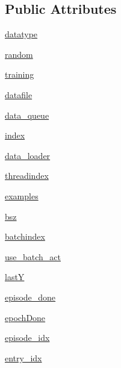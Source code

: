 \subsection*{Public Attributes}
\begin{DoxyCompactItemize}
\item 
\hyperlink{classparlai_1_1core_1_1teachers_1_1FixedDialogTeacher_a65c9039b783299ad6033ccbb995ca493}{datatype}
\item 
\hyperlink{classparlai_1_1core_1_1teachers_1_1FixedDialogTeacher_a7e5054e18ce919c0eb04188c801ddef1}{random}
\item 
\hyperlink{classparlai_1_1core_1_1teachers_1_1FixedDialogTeacher_af64b55521fe587c17696b0b805a2b0d4}{training}
\item 
\hyperlink{classparlai_1_1core_1_1teachers_1_1FixedDialogTeacher_a822d9f5c86ab0b0c608ae26901d3dec3}{datafile}
\item 
\hyperlink{classparlai_1_1core_1_1teachers_1_1FixedDialogTeacher_a59d9cf6a9e7f64a5d9a8d180ed06c001}{data\+\_\+queue}
\item 
\hyperlink{classparlai_1_1core_1_1teachers_1_1FixedDialogTeacher_a73ac86c06c926ab7aedd73d49e3bb2b5}{index}
\item 
\hyperlink{classparlai_1_1core_1_1teachers_1_1FixedDialogTeacher_a7edc6520195726382082a76486fa3747}{data\+\_\+loader}
\item 
\hyperlink{classparlai_1_1core_1_1teachers_1_1FixedDialogTeacher_a4443c43dc20f8f817c8cf28e2d795d6d}{threadindex}
\item 
\hyperlink{classparlai_1_1core_1_1teachers_1_1FixedDialogTeacher_a95eb8aeb051fc81a10ac7e1a7d5fed3d}{examples}
\item 
\hyperlink{classparlai_1_1core_1_1teachers_1_1FixedDialogTeacher_a2f6069ff207d360edf2729c245ceaa0f}{bsz}
\item 
\hyperlink{classparlai_1_1core_1_1teachers_1_1FixedDialogTeacher_a468d55710137a42b18f85212d7068c47}{batchindex}
\item 
\hyperlink{classparlai_1_1core_1_1teachers_1_1FixedDialogTeacher_a8a551d24fa77a0eb880cbee90b507f7e}{use\+\_\+batch\+\_\+act}
\item 
\hyperlink{classparlai_1_1core_1_1teachers_1_1FixedDialogTeacher_abf7e9a8868478220ca4df71dadeed4a9}{lastY}
\item 
\hyperlink{classparlai_1_1core_1_1teachers_1_1FixedDialogTeacher_a86428affae9471df880dd5e8dc4b90ed}{episode\+\_\+done}
\item 
\hyperlink{classparlai_1_1core_1_1teachers_1_1FixedDialogTeacher_a2fec0a004a2ea81402a66244c62b8607}{epoch\+Done}
\item 
\hyperlink{classparlai_1_1core_1_1teachers_1_1FixedDialogTeacher_afd4ebab8063eb42d182d30a1a41f133e}{episode\+\_\+idx}
\item 
\hyperlink{classparlai_1_1core_1_1teachers_1_1FixedDialogTeacher_ae3201b15f3c3b46a2f3511bad9b43e7d}{entry\+\_\+idx}
\end{DoxyCompactItemize}
